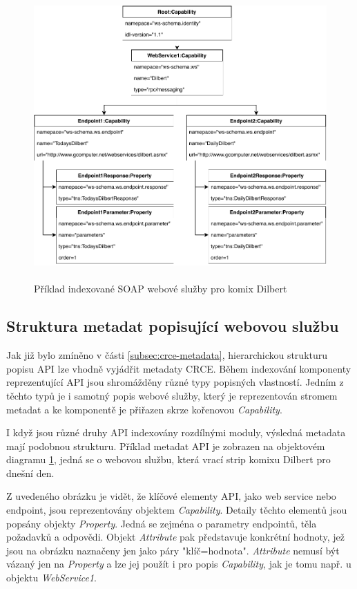 \documentclass[czech,DP]{thesiskiv}
\begin{document}
\begin{figure}[h]
	\centering
	\includegraphics[height=11cm]{indexed-api-example}
	\caption{Příklad indexované SOAP webové služby pro komix Dilbert }
	\label{fig:indexed-api-example}
\end{figure}

\subsection{Struktura metadat popisující webovou službu}

Jak již bylo zmíněno v části \ref{subsec:crce-metadata}, hierarchickou strukturu popisu API lze vhodně vyjádřit metadaty CRCE. Během indexování komponenty reprezentující API jsou shromážděny různé typy popisných vlastností. Jedním z těchto typů je i samotný popis webové služby, který je reprezentován stromem metadat a ke komponentě je přiřazen skrze  kořenovou \textit{Capability}.   

I když jsou různé druhy API indexovány rozdílnými moduly, výsledná metadata mají podobnou strukturu. Příklad metadat API je zobrazen na objektovém diagramu \ref{fig:indexed-api-example}, jedná se o webovou službu, která vrací strip komixu Dilbert pro dnešní den.

Z uvedeného obrázku je vidět, že klíčové elementy API, jako web service nebo endpoint, jsou reprezentovány objektem \textit{Capability}. Detaily těchto elementů jsou popsány objekty \textit{Property}. Jedná se zejména o parametry endpointů, těla požadavků a odpovědi. Objekt \textit{Attribute} pak představuje konkrétní hodnoty, jež jsou na obrázku naznačeny jen jako páry "klíč=hodnota". \textit{Attribute} nemusí být vázaný jen na \textit{Property} a lze jej použít i pro popis \textit{Capability}, jak je tomu např. u objektu \textit{WebService1}.
\end{document}
